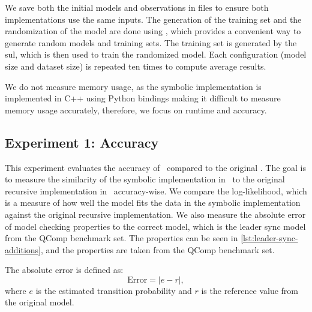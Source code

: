 We save both the initial models and observations in files to ensure both implementations use the same inputs.
The generation of the training set and the randomization of the model are done using \Jajapy, which provides a convenient way to generate random models and training sets.
The training set is generated by the \gls{sul}, which is then used to train the randomized model.
Each configuration (model size and dataset size) is repeated ten times to compute average results.

We do not measure memory usage, as the symbolic implementation is implemented in C++ using Python bindings making it difficult to measure memory usage accurately, therefore, we focus on runtime and accuracy.


\subsection{Experiment 1: Accuracy}\label{sec:exp_accuracy}
This experiment evaluates the accuracy of \Cupaal\ compared to the original \Jajapy.
The goal is to measure the similarity of the symbolic implementation in \Cupaal\ to the original recursive implementation in \Jajapy\ accuracy-wise.
We compare the log-likelihood, which is a measure of how well the model fits the data in the symbolic implementation against the original recursive implementation.
We also measure the absolute error of model checking properties to the correct model, which is the leader sync model from the QComp benchmark set.
The properties can be seen in \autoref{lst:leader-sync-additions}, and the properties are taken from the QComp benchmark set.

The absolute error is defined as:
\[
    \text{Error} = |e - r|,
\]
where $e$ is the estimated transition probability and $r$ is the reference value from the original model.

